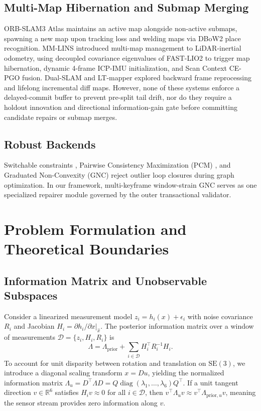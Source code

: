 \documentclass[journal]{IEEEtran}
\newcommand{\SE}{\mathrm{SE}(3)}
\begin{document}
\subsection{Multi-Map Hibernation and Submap Merging}
ORB-SLAM3 Atlas \cite{campos2021orbslam3} maintains an active map alongside non-active submaps, spawning a new map upon tracking loss and welding maps via DBoW2 place recognition. MM-LINS \cite{ma2025mmlins} introduced multi-map management to LiDAR-inertial odometry, using decoupled covariance eigenvalues of FAST-LIO2 \cite{xu2022fastlio2} to trigger map hibernation, dynamic 4-frame ICP-IMU initialization, and Scan Context \cite{kim2018scancontext} CE-PGO fusion. Dual-SLAM \cite{huang2020dualslam} and LT-mapper \cite{kim2022ltmapper} explored backward frame reprocessing and lifelong incremental diff maps. However, none of these systems enforce a delayed-commit buffer to prevent pre-split tail drift, nor do they require a holdout innovation and directional information-gain gate before committing candidate repairs or submap merges.

\subsection{Robust Backends}
Switchable constraints \cite{sunderhauf2012switchable}, Pairwise Consistency Maximization (PCM) \cite{mangelson2018pcm}, and Graduated Non-Convexity (GNC) \cite{yang2020gnc} reject outlier loop closures during graph optimization. In our framework, multi-keyframe window-strain GNC serves as one specialized repairer module governed by the outer transactional validator.

\section{Problem Formulation and Theoretical Boundaries}

\subsection{Information Matrix and Unobservable Subspaces}
Consider a linearized measurement model $z_i = h_i(x) + \epsilon_i$ with noise covariance $R_i$ and Jacobian $H_i = \partial h_i / \partial x|_{\hat{x}}$. The posterior information matrix over a window of measurements $\mathcal{D} = \{z_i, H_i, R_i\}$ is
\begin{equation}
    \Lambda = \Lambda_{\mathrm{prior}} + \sum_{i\in\mathcal{D}} H_i^\top R_i^{-1} H_i.
    \label{eq:fim}
\end{equation}
To account for unit disparity between rotation and translation on $\SE$, we introduce a diagonal scaling transform $x = D u$, yielding the normalized information matrix $\Lambda_u = D^\top \Lambda D = Q \operatorname{diag}(\lambda_1,\dots,\lambda_6) Q^\top$. If a unit tangent direction $v \in \mathbb{R}^6$ satisfies $H_i v \approx 0$ for all $i \in \mathcal{D}$, then $v^\top \Lambda_u v \approx v^\top \Lambda_{\mathrm{prior},u} v$, meaning the sensor stream provides zero information along $v$.
\end{document}
